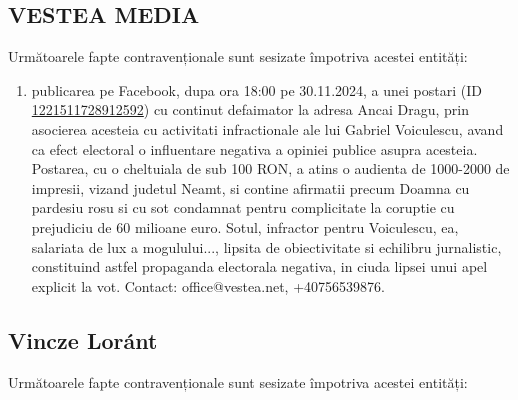 \documentclass[a4paper,12pt]{article}
\begin{document}
\vspace{0.5cm}

\subsection{VESTEA MEDIA}
Următoarele fapte contravenționale sunt sesizate împotriva acestei entități:

\begin{enumerate}[leftmargin=*, label=\arabic*.)]
    \item publicarea pe Facebook, dupa ora 18:00 pe 30.11.2024, a unei postari (ID \href{https://www.facebook.com/ads/library/?id=1221511728912592}{1221511728912592}) cu continut defaimator la adresa Ancai Dragu, prin asocierea acesteia cu activitati infractionale ale lui Gabriel Voiculescu, avand ca efect electoral o influentare negativa a opiniei publice asupra acesteia. Postarea, cu o cheltuiala de sub 100 RON, a atins o audienta de 1000-2000 de impresii, vizand judetul Neamt, si contine afirmatii precum Doamna cu pardesiu rosu si cu sot condamnat pentru complicitate la coruptie cu prejudiciu de 60 milioane euro. Sotul, infractor pentru Voiculescu, ea, salariata de lux a mogulului...,  lipsita de obiectivitate si echilibru jurnalistic, constituind astfel propaganda electorala negativa, in ciuda lipsei unui apel explicit la vot.  Contact: office@vestea.net, +40756539876.
\end{enumerate}

\vspace{0.5cm}

\subsection{Vincze Loránt}
Următoarele fapte contravenționale sunt sesizate împotriva acestei entități:
\end{document}
